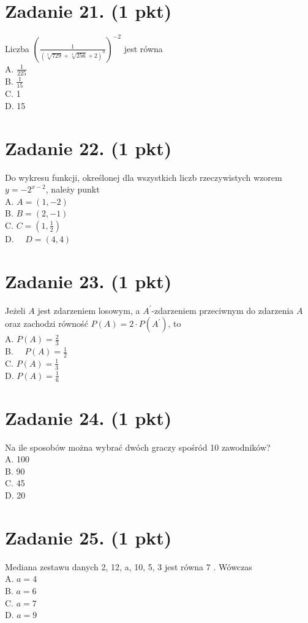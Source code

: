 \documentclass[10pt]{article}
\begin{document}
\section*{Zadanie 21. (1 pkt)}
Liczba \(\left(\frac{1}{(\sqrt[3]{729}+\sqrt[4]{256}+2)^{0}}\right)^{-2}\) jest równa\\
A. \(\frac{1}{225}\)\\
B. \(\frac{1}{15}\)\\
C. 1\\
D. 15

\section*{Zadanie 22. (1 pkt)}
Do wykresu funkcji, określonej dla wszystkich liczb rzeczywistych wzorem \(y=-2^{x-2}\), należy punkt\\
A. \(A=(1,-2)\)\\
B. \(B=(2,-1)\)\\
C. \(C=\left(1, \frac{1}{2}\right)\)\\
D. \(\quad D=(4,4)\)

\section*{Zadanie 23. (1 pkt)}
Jeżeli \(A\) jest zdarzeniem losowym, a \(A^{\prime}\)-zdarzeniem przeciwnym do zdarzenia \(A\) oraz zachodzi równość \(P(A)=2 \cdot P\left(A^{\prime}\right)\), to\\
A. \(P(A)=\frac{2}{3}\)\\
B. \(\quad P(A)=\frac{1}{2}\)\\
C. \(P(A)=\frac{1}{3}\)\\
D. \(P(A)=\frac{1}{6}\)

\section*{Zadanie 24. (1 pkt)}
Na ile sposobów można wybrać dwóch graczy spośród 10 zawodników?\\
A. 100\\
B. 90\\
C. 45\\
D. 20

\section*{Zadanie 25. (1 pkt)}
Mediana zestawu danych 2, 12, a, 10, 5, 3 jest równa 7 . Wówczas\\
A. \(a=4\)\\
B. \(a=6\)\\
C. \(a=7\)\\
D. \(a=9\)
\end{document}
